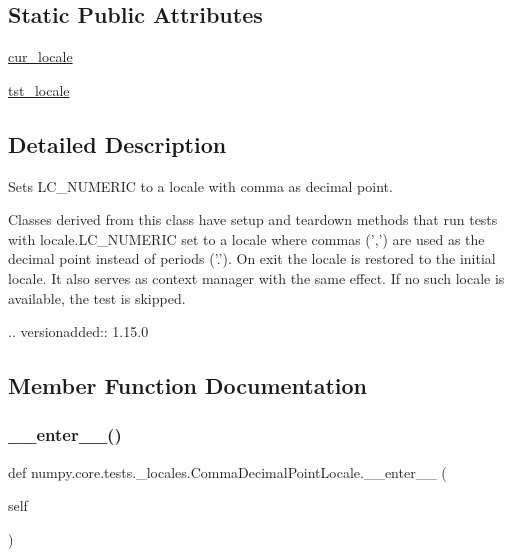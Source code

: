 \subsection*{Static Public Attributes}
\begin{DoxyCompactItemize}
\item 
\hyperlink{classnumpy_1_1core_1_1tests_1_1__locales_1_1CommaDecimalPointLocale_a7b02cc4f78985a3a552a1751d846f05d}{cur\+\_\+locale}
\item 
\hyperlink{classnumpy_1_1core_1_1tests_1_1__locales_1_1CommaDecimalPointLocale_a8c7ef176950dc8e26b6d4fbd33eb8021}{tst\+\_\+locale}
\end{DoxyCompactItemize}


\subsection{Detailed Description}
\begin{DoxyVerb}Sets LC_NUMERIC to a locale with comma as decimal point.

Classes derived from this class have setup and teardown methods that run
tests with locale.LC_NUMERIC set to a locale where commas (',') are used as
the decimal point instead of periods ('.'). On exit the locale is restored
to the initial locale. It also serves as context manager with the same
effect. If no such locale is available, the test is skipped.

.. versionadded:: 1.15.0\end{DoxyVerb}
 

\subsection{Member Function Documentation}
\mbox{\label{classnumpy_1_1core_1_1tests_1_1__locales_1_1CommaDecimalPointLocale_a2db23aa216e0697e611703d2ee6c5888}} 
\subsubsection{\texorpdfstring{\+\_\+\+\_\+enter\+\_\+\+\_\+()}{\_\_enter\_\_()}}
{\footnotesize\ttfamily def numpy.\+core.\+tests.\+\_\+locales.\+Comma\+Decimal\+Point\+Locale.\+\_\+\+\_\+enter\+\_\+\+\_\+ (\begin{DoxyParamCaption}\item[{}]{self }\end{DoxyParamCaption})}

